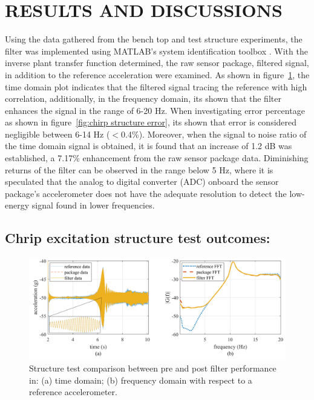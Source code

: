 \documentclass[]{spie}  %
\begin{document}
	\section{RESULTS AND DISCUSSIONS}
	Using the data gathered from the bench top and test structure experiments, the filter was implemented using MATLAB’s system identification toolbox \cite{MAT2014}. With the inverse plant transfer function determined, the raw sensor package, filtered signal, in addition to the reference acceleration were examined. As shown in figure~\ref{fig:Chrip Structure Test}, the time domain plot indicates that the filtered signal tracing the reference with high correlation, additionally, in the frequency domain, its shown that the filter enhances the signal in the range of 6-20 Hz. When investigating error percentage as shown in figure~\ref{fig:chirp structure error}, its shown that error is considered negligible between 6-14 Hz ($<$0.4\%). Moreover, when the signal to noise ratio of the time domain signal is obtained, it is found that an increase of 1.2 dB was established, a 7.17\% enhancement from the raw sensor package data. Diminishing returns of the filter can be observed in the range below 5 Hz, where it is speculated that the analog to digital converter (ADC) onboard the sensor package’s accelerometer does not have the adequate resolution to detect the low-energy signal found in lower frequencies.
	
	\subsection{Chrip excitation structure test outcomes:}
	
	\begin{figure} [H]
		\centering
		\includegraphics[width=6 in]{figures/Chrip Structure Test.png}
		\caption{Structure test comparison between pre and post filter performance in: (a) time domain; (b) frequency domain with respect to a reference accelerometer.}
		\label{fig:Chrip Structure Test} 
	\end{figure} 
	
\end{document}
